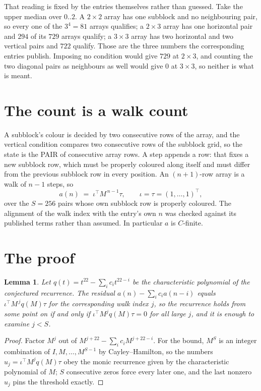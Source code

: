 \documentclass[11pt,a4paper]{article}
\theoremstyle{plain}
\newtheorem{lemma}[theorem]{Lemma}
\theoremstyle{definition}
\begin{document}
That reading is fixed by the entries themselves rather than guessed. Take the upper median
over $0..2$. A $2\times2$ array has one subblock and no neighbouring pair, so every one of the
$3^4=81$ arrays qualifies; a $2\times3$ array has one horizontal pair and $294$ of its $729$
arrays qualify; a $3\times3$ array has two horizontal and two vertical pairs and $722$
qualify. Those are the three numbers the corresponding entries publish. Imposing no condition
would give $729$ at $2\times3$, and counting the two diagonal pairs as neighbours as well
would give $0$ at $3\times3$, so neither is what is meant.

\section{The count is a walk count}

A subblock's colour is decided by two consecutive rows of the array, and
the vertical condition compares two consecutive rows of the subblock grid, so the state is the
PAIR of consecutive array rows. A step appends a row: that fixes a new subblock row, which
must be properly coloured along itself and must differ from the previous subblock row in every
position. An $(n+1)$-row array is a walk of $n-1$ steps, so
\[
a(n)\;=\;\iota^{\!\top}M^{\,n-1}\tau,\qquad\iota=\tau=(1,\dots,1)^{\!\top},
\]
over the $S=256$ pairs whose own subblock row is properly coloured.
The alignment of the walk index with the entry's own $n$ was checked against its published
terms rather than assumed. In particular $a$ is $C$-finite.

\section{The proof}

\begin{lemma}\label{lem:crit}
Let $q(t)=t^{22}-\sum_i c_it^{22-i}$ be the characteristic polynomial of the
conjectured recurrence. The residual $a(n)-\sum_ic_ia(n-i)$ equals
$\iota^{\!\top}M^{\,j}q(M)\tau$ for the corresponding walk index $j$, so the recurrence
holds from some point on if and only if $\iota^{\!\top}M^{j}q(M)\tau=0$ for all large $j$,
and it is enough to examine $j<S$.
\end{lemma}

\begin{proof}
Factor $M^{j}$ out of $M^{j+22}-\sum_ic_iM^{j+22-i}$. For the bound, $M^{S}$
is an integer combination of $I,M,\dots,M^{S-1}$ by Cayley--Hamilton, so the numbers
$u_j=\iota^{\!\top}M^{j}q(M)\tau$ obey the monic recurrence given by the characteristic
polynomial of $M$; $S$ consecutive zeros force every later one, and the last nonzero $u_j$
pins the threshold exactly.
\end{proof}
\end{document}
